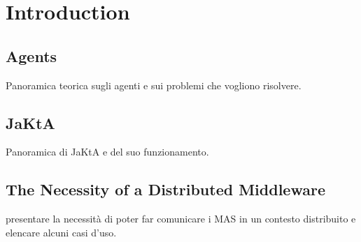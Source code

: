 \section{Introduction}

\subsection{Agents}
Panoramica teorica sugli agenti e sui problemi che vogliono risolvere.

\subsection{JaKtA}
Panoramica di JaKtA e del suo funzionamento.

\subsection{The Necessity of a Distributed Middleware}
presentare la necessità di poter far comunicare i MAS in un contesto distribuito e elencare alcuni casi d'uso.

